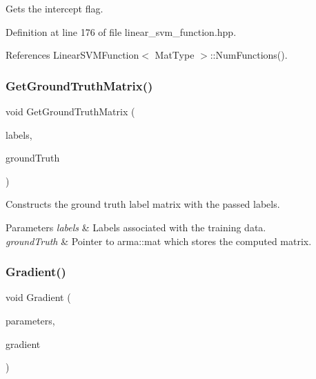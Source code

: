 Gets the intercept flag. 



Definition at line 176 of file linear\+\_\+svm\+\_\+function.\+hpp.



References Linear\+S\+V\+M\+Function$<$ Mat\+Type $>$\+::\+Num\+Functions().

\mbox{\label{classmlpack_1_1svm_1_1LinearSVMFunction_afb090fbee5f880dd69edde4cdd0797cd}} 
\subsubsection{Get\+Ground\+Truth\+Matrix()}
{\footnotesize\ttfamily void Get\+Ground\+Truth\+Matrix (\begin{DoxyParamCaption}\item[{const arma\+::\+Row$<$ size\+\_\+t $>$ \&}]{labels,  }\item[{arma\+::sp\+\_\+mat \&}]{ground\+Truth }\end{DoxyParamCaption})}



Constructs the ground truth label matrix with the passed labels. 


\begin{DoxyParams}{Parameters}
{\em labels} & Labels associated with the training data. \\
\hline
{\em ground\+Truth} & Pointer to arma\+::mat which stores the computed matrix. \\
\hline
\end{DoxyParams}
\mbox{\label{classmlpack_1_1svm_1_1LinearSVMFunction_a306147f4dffda5b0972a12de487ece8e}} 
\subsubsection{Gradient()\hspace{0.1cm}{\footnotesize\ttfamily [1/2]}}
{\footnotesize\ttfamily void Gradient (\begin{DoxyParamCaption}\item[{const arma\+::mat \&}]{parameters,  }\item[{Grad\+Type \&}]{gradient }\end{DoxyParamCaption})}




